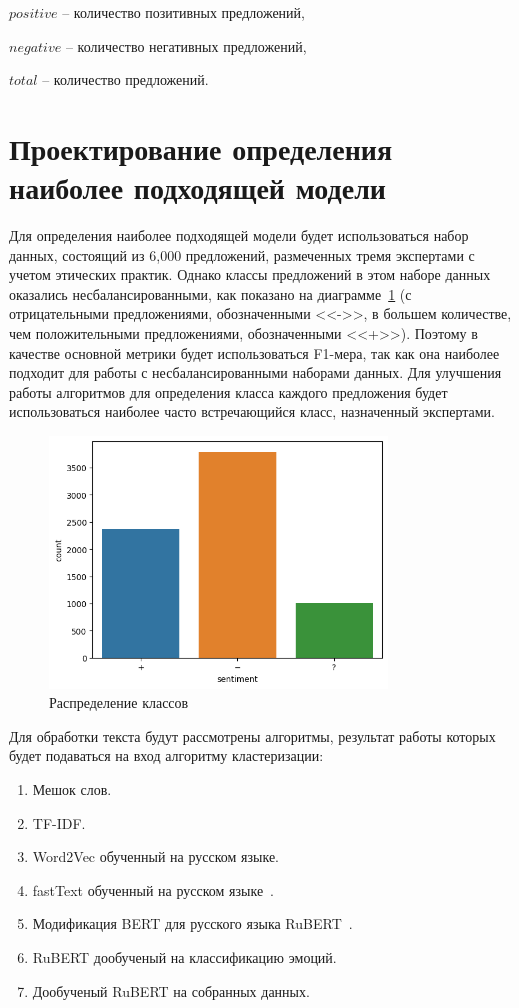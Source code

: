 \documentclass[PI, VKR]{HSEUniversity}
\begin{document}
\(positive\) -- количество позитивных предложений,

\(negative\) -- количество негативных предложений,

\(total\) -- количество предложений.
\section{Проектирование определения наиболее подходящей модели}
\label{sec:org5f307f3}
Для определения наиболее подходящей модели будет использоваться набор данных, состоящий из 6,000 предложений, размеченных тремя экспертами с учетом этических практик. Однако классы предложений в этом наборе данных оказались несбалансированными, как показано на диаграмме~\ref{fig:class_balance} (с отрицательными предложениями, обозначенными {}<<->>{}, в большем количестве, чем положительными предложениями, обозначенными {}<<+>>{}). Поэтому в качестве основной метрики будет использоваться F1-мера, так как она наиболее подходит для работы с несбалансированными наборами данных. Для улучшения работы алгоритмов для определения класса каждого предложения будет использоваться наиболее часто встречающийся класс, назначенный экспертами.

\begin{figure}[h!]
\centering
\includegraphics[width=0.8\textwidth]{img/class_balance.png}
\caption{\label{fig:class_balance}Распределение классов}
\end{figure}

Для обработки текста будут рассмотрены алгоритмы, результат работы которых будет подаваться на вход алгоритму кластеризации:
\begin{enumerate}
\item Мешок слов.
\item TF-IDF.
\item Word2Vec обученный на русском языке.
\item fastText обученный на русском языке~\autocite{korogodina_evaluation_2020}.
\item Модификация BERT для русского языка RuBERT~\autocite{kuratov_adaptation_2019}.
\item RuBERT дообученый на классификацию эмоций.
\item Дообученый RuBERT на собранных данных.
\end{enumerate}
\end{document}
